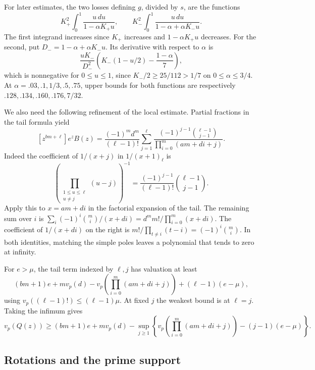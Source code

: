 For later estimates, the two losses defining \(g\), divided
by \(s\), are the functions
\begin{equation}\label{eq:pade-loss}
 K_+^2\int_0^1\frac{u\,du}{1-\alpha K_+u},
 \qquad
 K_-^2\int_0^1\frac{u\,du}{1-\alpha+\alpha K_-u}.
\end{equation}
The first integrand increases since \(K_+\) increases and
\(1-\alpha K_+u\) decreases. For the second, put
\(D_-=1-\alpha+\alpha K_-u\). Its derivative with respect to
\(\alpha\) is
\[
 \frac{uK_-}{D_-^2}
 \left(K_-(1-u/2)-\frac{1-\alpha}{7}\right),
\]
which is nonnegative for \(0\le u\le1\), since
\(K_-/2\ge25/112>1/7\) on \(0\le\alpha\le3/4\).
At \(\alpha=.03,.1,1/3,.5,.75\), upper bounds for both
functions are respectively \(.128,.134,.160,.176,7/32\).

We also need the following refinement of the local estimate.
Partial fractions in the tail formula yield
\[
 [z^{bm+\ell}]e^z B(z)=
 \frac{(-1)^m d^m}{(\ell-1)!}
 \sum_{j=1}^\ell
 \frac{(-1)^{j-1}\binom{\ell-1}{j-1}}
      {\prod_{i=0}^m(am+di+j)} .
\]
Indeed the coefficient of \(1/(x+j)\) in \(1/(x+1)_\ell\) is
\[
 \left(\prod_{\substack{1\le u\le\ell\\u\ne j}}(u-j)\right)^{-1}
 =\frac{(-1)^{j-1}}{(\ell-1)!}\binom{\ell-1}{j-1}.
\]
Apply this to \(x=am+di\) in the factorial expansion of the
tail. The remaining sum over \(i\) is
\(\sum_i(-1)^i\binom mi/(x+di)=d^m m!/\prod_{i=0}^m(x+di)\).
The coefficient of \(1/(x+di)\) on the right is
\(m!/\prod_{t\ne i}(t-i)=(-1)^i\binom mi\).
In both identities, matching the simple poles leaves a polynomial
that tends to zero at infinity.

For \(e>\mu\), the tail term indexed by \(\ell,j\) has
valuation at least
\[
 (bm+1)e+m v_p(d)
  -v_p\!\left(\prod_{i=0}^m(am+di+j)\right)+(\ell-1)(e-\mu),
\]
using \(v_p((\ell-1)!)\le(\ell-1)\mu\).
At fixed \(j\) the weakest bound is at \(\ell=j\).
Taking the infimum gives
\begin{equation}\label{eq:pade-progression}
 v_p(Q(z))\ge (bm+1)e+m v_p(d)-
 \sup_{j\ge1}\left\{v_p\!\left(\prod_{i=0}^m(am+di+j)\right)
                        -(j-1)(e-\mu)\right\}.
\end{equation}

\subsection{Rotations and the prime support}

